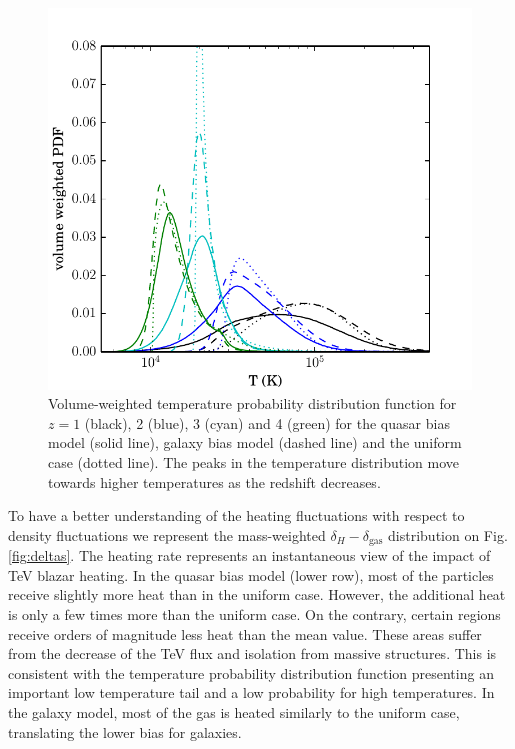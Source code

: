 \documentclass[numberedappendix]{emulateapj}
\begin{document}
\begin{figure}[h]
\centering
\includegraphics[width = .45\textwidth ]{full_PDF_256_gal_qso.pdf}
\caption{Volume-weighted temperature probability distribution function for $z=1$ (black), 2 (blue), 3 (cyan) and 4 (green) for the quasar bias model (solid line), galaxy bias model (dashed line) and the uniform case (dotted line). The peaks in the temperature distribution move towards higher temperatures as the redshift decreases.}
\label{fig:PDF}
\end{figure}
To have a better understanding of the heating fluctuations with respect to density fluctuations we represent the mass-weighted $\delta_H-\delta_{\mathrm{gas}}$ distribution on Fig. \ref{fig:deltas}. The heating rate represents an instantaneous view of the impact of TeV blazar heating. In the quasar bias model (lower row), most of the particles receive slightly more heat than in the uniform case. However, the additional heat is only a few times more than the uniform case. On the contrary, certain regions receive orders of magnitude less heat than the mean value. These areas suffer from the decrease of the TeV flux and isolation from massive structures. This is consistent with the temperature probability distribution function presenting an important low temperature tail and a low probability for high temperatures. In the galaxy model, most of the gas is heated similarly to the uniform case, translating the lower bias for galaxies.
\end{document}
